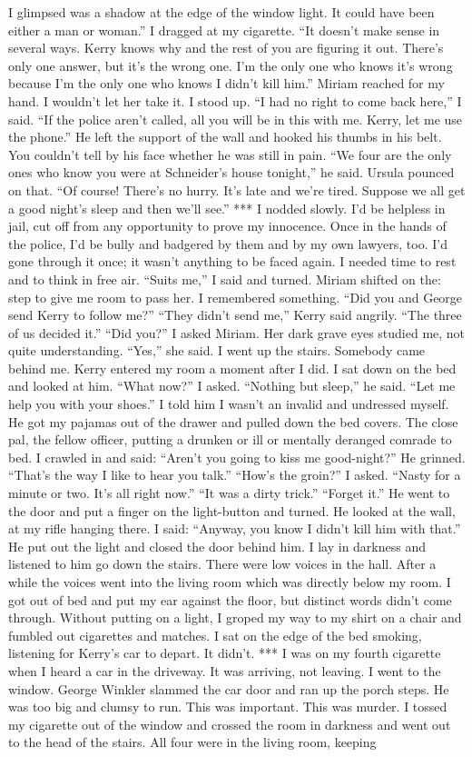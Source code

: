 \documentclass{novel}
\begin{document}
I glimpsed was a shadow at the edge of the window light. It could have been either a man or woman.” I dragged at my cigarette. “It doesn’t make sense in several ways. Kerry knows why and the rest of you are figuring it out. There’s only one answer, but it’s the wrong one. I’m the only one who knows it’s wrong because I’m the only one who knows I didn’t kill him.” Miriam reached for my hand. I wouldn’t let her take it. I stood up. “I had no right to come back here,” I said. “If the police aren’t called, all you will be in this with me. Kerry, let me use the phone.” He left the support of the wall and hooked his thumbs in his belt. You couldn’t tell by his face whether he was still in pain. “We four are the only ones who know you were at Schneider’s house tonight,” he said. Ursula pounced on that. “Of course! There’s no hurry. It’s late and we’re tired. Suppose we all get a good night’s sleep and then we’ll see.” *** I nodded slowly. I’d be helpless in jail, cut off from any opportunity to prove my innocence. Once in the hands of the police, I’d be bully and badgered by them and by my own lawyers, too. I’d gone through it once; it wasn’t anything to be faced again. I needed time to rest and to think in free air. “Suits me,” I said and turned. Miriam shifted on the: step to give me room to pass her. I remembered something. “Did you and George send Kerry to follow me?” “They didn’t send me,” Kerry said angrily. “The three of us decided it.” “Did you?” I asked Miriam. Her dark grave eyes studied me, not quite understanding. “Yes,” she said. I went up the stairs. Somebody came behind me. Kerry entered my room a moment after I did. I sat down on the bed and looked at him. “What now?” I asked. “Nothing but sleep,” he said. “Let me help you with your shoes.” I told him I wasn’t an invalid and undressed myself. He got my pajamas out of the drawer and pulled down the bed covers. The close pal, the fellow officer, putting a drunken or ill or mentally deranged comrade to bed. I crawled in and said: “Aren’t you going to kiss me good-night?” He grinned. “That’s the way I like to hear you talk.” “How’s the groin?” I asked. “Nasty for a minute or two. It’s all right now.” “It was a dirty trick.” “Forget it.” He went to the door and put a finger on the light-button and turned. He looked at the wall, at my rifle hanging there. I said: “Anyway, you know I didn’t kill him with that.” He put out the light and closed the door behind him. I lay in darkness and listened to him go down the stairs. There were low voices in the hall. After a while the voices went into the living room which was directly below my room. I got out of bed and put my ear against the floor, but distinct words didn’t come through. Without putting on a light, I groped my way to my shirt on a chair and fumbled out cigarettes and matches. I sat on the edge of the bed smoking, listening for Kerry’s car to depart. It didn’t. *** I was on my fourth cigarette when I heard a car in the driveway. It was arriving, not leaving. I went to the window. George Winkler slammed the car door and ran up the porch steps. He was too big and clumsy to run. This was important. This was murder. I tossed my cigarette out of the window and crossed the room in darkness and went out to the head of the stairs. All four were in the living room, keeping 
\end{document}
